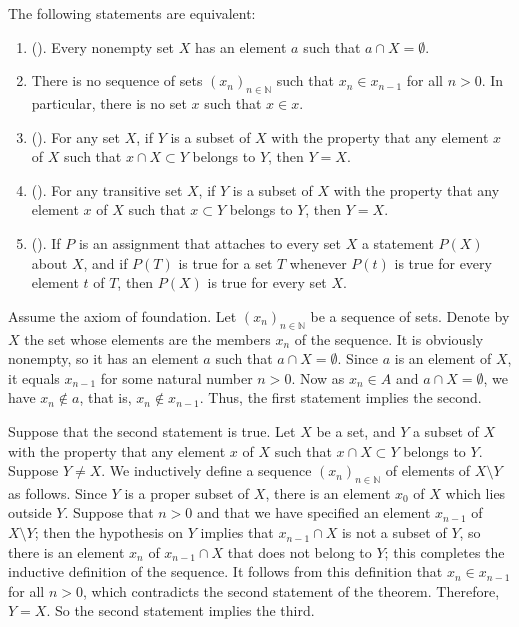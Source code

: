 \documentclass{article}
\begin{document}
\begin{theorem}
  \label{thm:3e5kymup}
  The following statements are equivalent:
  \begin{enumerate}
  \item ().  Every nonempty set \(X\)
    has an element \(a\) such that \(a \cap X = \emptyset\).
  \item There is no sequence of sets \((x_n)_{n \in \mathbb{N}}\) such
    that \(x_n \in x_{n - 1}\) for all \(n > 0\).  In particular,
    there is no set \(x\) such that \(x \in x\).
  \item (). For any set
    \(X\), if \(Y\) is a subset of \(X\) with the property that any
    element \(x\) of \(X\) such that \(x \cap X \subset Y\) belongs to
    \(Y\), then \(Y = X\).
  \item (). For any
    transitive set \(X\), if \(Y\) is a subset of \(X\) with the
    property that any element \(x\) of \(X\) such that \(x \subset Y\)
    belongs to \(Y\), then \(Y = X\).
  \item (). If \(P\) is an
    assignment that attaches to every set \(X\) a statement \(P(X)\)
    about \(X\), and if \(P(T)\) is true for a set \(T\) whenever
    \(P(t)\) is true for every element \(t\) of \(T\), then \(P(X)\)
    is true for every set \(X\).
  \end{enumerate}
\end{theorem}

Assume the axiom of foundation.  Let \((x_n)_{n \in \mathbb{N}}\) be a
sequence of sets.  Denote by \(X\) the set whose elements are the
members \(x_n\) of the sequence.  It is obviously nonempty, so it has
an element \(a\) such that \(a \cap X = \emptyset\).  Since \(a\) is
an element of \(X\), it equals \(x_{n - 1}\) for some natural number
\(n > 0\).  Now as \(x_n \in A\) and \(a \cap X = \emptyset\), we have
\(x_n \notin a\), that is, \(x_n \notin x_{n - 1}\).  Thus, the first
statement implies the second.

Suppose that the second statement is true.  Let \(X\) be a set, and
\(Y\) a subset of \(X\) with the property that any element \(x\) of
\(X\) such that \(x \cap X \subset Y\) belongs to \(Y\).  Suppose
\(Y \neq X\).  We inductively define a sequence
\((x_n)_{n \in \mathbb{N}}\) of elements of \(X \setminus Y\) as
follows.  Since \(Y\) is a proper subset of \(X\), there is an element
\(x_0\) of \(X\) which lies outside \(Y\).  Suppose that \(n > 0\) and
that we have specified an element \(x_{n - 1}\) of \(X \setminus Y\);
then the hypothesis on \(Y\) implies that \(x_{n - 1} \cap X\) is not
a subset of \(Y\), so there is an element \(x_n\) of
\(x_{n - 1} \cap X\) that does not belong to \(Y\); this completes the
inductive definition of the sequence.  It follows from this definition
that \(x_n \in x_{n - 1}\) for all \(n > 0\), which contradicts the
second statement of the theorem.  Therefore, \(Y = X\).  So the second
statement implies the third.
\end{document}
